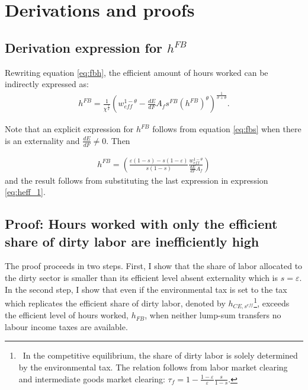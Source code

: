 \section{Derivations and proofs}\label{app:derivations}
\subsection{Derivation expression for $h^{FB}$}
Rewriting equation \ref{eq:fbh}, the efficient amount of hours worked can be indirectly expressed as:
\begin{align}
h^{FB}=\frac{1}{\chi^\frac{1}{\sigma}}\left(w_{eff}^{1-\theta}-\frac{dE}{dF}A_f s^{FB}\left(h^{FB}\right)^\theta \right)^\frac{1}{\sigma+\theta}.\label{eq:heff_1}
\end{align}

Note that an explicit expression for $h^{FB}$ follows from equation \ref{eq:fbs} when there is an externality and $\frac{dE}{dF}\neq 0$. Then 

\begin{align}
h^{FB}= \left(\frac{\varepsilon(1-s)-s(1-\varepsilon)}{s(1-s)}\frac{w_{eff}^{1-\theta}}{\frac{dE}{dF}A_f }\right)
\end{align}
and the result follows from substituting the last expression in expression  \ref{eq:heff_1}.

\subsection{Proof: Hours worked with only the efficient share of dirty labor are inefficiently high}

The proof proceeds in two steps. First, I show that the share of labor allocated to the dirty sector is smaller than its efficient level absent externality which is $s=\varepsilon$.
In the second step, I show that even if the environmental tax is set to the tax which replicates the efficient share of dirty labor, denoted by $h_{CE, s^{eff}}$\footnote{\ In the competitive equilibrium, the share of dirty labor is solely determined by the environmental tax. The relation follows from labor market clearing and intermediate goods market clearing: $\tau_f=1-\frac{1-\varepsilon}{\varepsilon}\frac{s}{1-s}$.}, exceeds the efficient level of hours worked, $h_{FB}$, when neither lump-sum transfers no labour income taxes are available.

